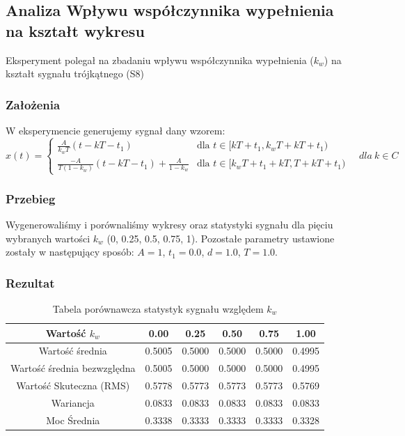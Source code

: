 \documentclass[12pt]{article}
\begin{document}
\newpage
\subsection{Analiza Wpływu współczynnika wypełnienia na kształt wykresu}
Eksperyment polegał na zbadaniu wpływu współczynnika wypełnienia ($k_w$) na kształt sygnału trójkątnego (S8)

\subsubsection{Założenia}
W eksperymencie generujemy sygnał dany wzorem:
\begin{equation}
x(t) = 
\begin{cases} 
\frac{A}{k_w T}(t - kT - t_1) & \text{dla } t \in [kT + t_1, k_w T + kT + t_1) \\ 
\frac{-A}{T(1 - k_w)}(t - kT - t_1) + \frac{A}{1 - k_w} & \text{dla } t \in [k_w T + t_1 + kT, T + kT + t_1) 
\end{cases} 
\quad dla \ k \in C
\end{equation}

\subsubsection{Przebieg}
Wygenerowaliśmy i porównaliśmy wykresy oraz statystyki sygnału dla pięciu wybranych wartości $k_w$ (0, 0.25, 0.5, 0.75, 1). Pozostałe parametry ustawione zostały w następujący sposób: $A = 1$, $t_1 = 0.0$, $d = 1.0$, $T = 1.0$.

\subsubsection{Rezultat}
\begin{table}[H]
    \centering
    \begin{tabular}{|c|c|c|c|c|c|}
    \hline
        \textbf{Wartość $k_w$} & \textbf{0.00} & \textbf{0.25} & \textbf{0.50} & \textbf{0.75} & \textbf{1.00} \\ \hline
        Wartość średnia & 0.5005 & 0.5000 & 0.5000 & 0.5000 & 0.4995\\ \hline
        Wartość średnia bezwzględna & 0.5005 & 0.5000 & 0.5000 & 0.5000 & 0.4995\\ \hline
        Wartość Skuteczna (RMS) & 0.5778 & 0.5773 & 0.5773 & 0.5773 & 0.5769\\ \hline
        Wariancja & 0.0833 & 0.0833 & 0.0833 & 0.0833 & 0.0833\\ \hline
        Moc Średnia & 0.3338 & 0.3333 & 0.3333 & 0.3333 & 0.3328 \\ \hline
    \end{tabular}
    \caption{Tabela porównawcza statystyk sygnału względem $k_w$}
\end{table}
\end{document}
